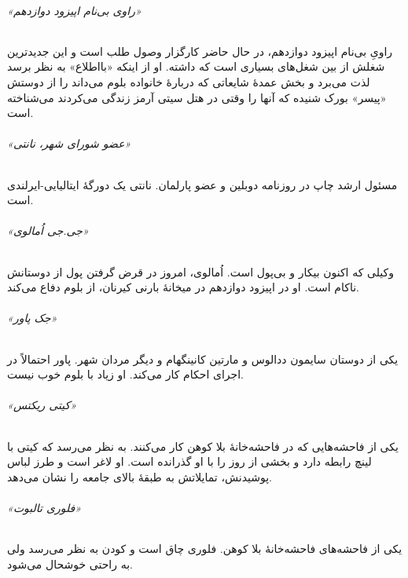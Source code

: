 \documentclass[12pt]{book}
\newcommand{\noun}[1]{«{#1}»}
\begin{document}
    \paragraph{\noun{راوی بی‌نام اپیزود دوازدهم}}
    راویِ بی‌نام اپیزود دوازدهم، در حال حاضر کارگزار وصول طلب است و این جدیدترین شغلش از بین شغل‌های بسیاری است که داشته. او از اینکه «بااطلاع» به نظر برسد لذت می‌برد و بخش عمدۀ شایعاتی که دربارۀ خانواده بلوم می‌داند را از دوستش «پیسر» بورک شنیده که آنها را وقتی در هتل سیتی آرمز زندگی می‌کردند می‌شناخته است.
    \paragraph{\noun{عضو شورای شهر، نانتی}\protect{}}
    مسئول ارشد چاپ در روزنامه دوبلین و عضو پارلمان. نانتی یک دورگۀ ایتالیایی-ایرلندی است.
    \paragraph{\noun{جی.جی اُمالوی}\protect{}}
    وکیلی که اکنون بیکار و بی‌پول است. اُمالوی، امروز در قرض گرفتن پول از دوستانش ناکام است. او در اپیزود دوازدهم در میخانۀ بارنی کیرنان، از بلوم دفاع می‌کند.
    \paragraph{\noun{جک پاور}\protect{}}
    یکی از دوستان سایمون ددالوس و مارتین کانینگهام و دیگر مردان شهر. پاور احتمالاً در اجرای احکام کار می‌کند. او زیاد با بلوم خوب نیست.
    \paragraph{\noun{کیتی ریکتس}\protect{}}
    یکی از فاحشه‌هایی که در فاحشه‌خانۀ بلا کوهن کار می‌کنند. به نظر می‌رسد که کیتی با لینچ رابطه دارد و بخشی از روز را با او گذرانده است. او لاغر است و طرز لباس پوشیدنش، تمایلاتش به طبقۀ بالای جامعه را نشان می‌دهد.
    \paragraph{\noun{فلوری تالبوت}\protect{}}
    یکی از فاحشه‌های فاحشه‌خانۀ بلا کوهن. فلوری چاق است و کودن به نظر می‌رسد ولی به راحتی خوشحال می‌شود.

    \part{}
\end{document}
